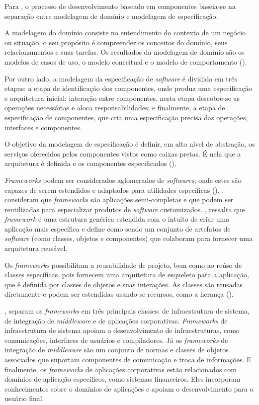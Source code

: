 Para \cite{cheesman:2001}, o processo de desenvolvimento baseado em componentes baseia-se na separação entre modelagem de domínio e modelagem de especificação.

A modelagem do domínio consiste no entendimento do contexto de um negócio ou situação, o seu propósito é compreender os conceitos do domínio, seus relacionamentos e suas tarefas. Os resultados da modelagem de domínio são os modelos de casos de uso, o modelo conceitual e o modelo de comportamento (\cite{itana:2005}).

Por outro lado, a modelagem da especificação de \textit{software} é dividida em três etapas: a etapa de identificação dos componentes, onde produz uma especificação e arquitetura inicial; interação entre componentes, nesta etapa descobre-se as operações necessárias e aloca responsabilidades; e finalmente, a etapa de especificação de componentes, que cria uma especificação precisa das operações, interfaces e componentes.  

O objetivo da modelagem de especificação é definir, em alto nível de abstração, os serviços oferecidos pelos componentes vistos como caixas pretas. É nela que a arquitetura é definida e os componentes especificados (\cite{itana:2005}).

\textit{Frameworks} podem ser considerados aglomerados de \textit{softwares}, onde estes são capazes de serem estendidos e adaptados para utilidades específicas (\cite{taligent:1994}). \cite{pree:1997}, consideram que  \textit{frameworks} são aplicações semi-completas e que podem ser reutilizadas para especializar produtos de \textit{software} customizados. \cite{sommerville:2013}, ressalta que \textit{framework} é uma estrutura genérica estendida com o intuito de criar uma aplicação mais específica e \cite{schmidt:2004} define como sendo um conjunto de artefatos de \textit{software} (como classes, objetos e componentes) que colaboram para fornecer uma arquitetura reusável.

Os \textit{frameworks} possibilitam a reusabilidade de projeto, bem como ao reúso de classes específicas, pois fornecem uma arquitetura de esqueleto para a aplicação, que é definida por classes de objetos e suas interações. As classes são reusadas diretamente e podem ser estendidas usando-se recursos, como a herança (\cite{sommerville:2013}). 

\cite{fayad:1997}, separam os \textit{frameworks} em três principais classes: de infraestrutura de sistema, de integração de \textit{middleware} e de aplicações corporativas. \textit{Frameworks} de infraestrutura de sistema apoiam o desenvolvimento de infraestruturas, como comunicações, interfaces de usuários e compiladores. Já os \textit{frameworks} de integração de \textit{middleware} são um conjunto de normas e classes de objetos associados que suportam componentes de comunicação e troca de informações. E finalmente, os \textit{frameworks} de aplicações corporativas estão relacionados com domínios de aplicação específicos, como sistemas financeiros. Eles incorporam conhecimentos sobre o domínios de aplicações e apoiam o desenvolvimento para o usuário final.

